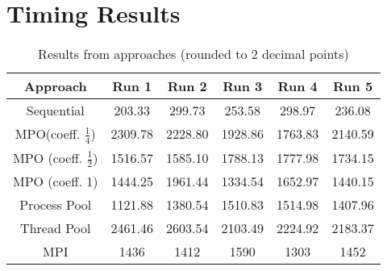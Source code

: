 \documentclass[a4paper, oneside]{article}
\begin{document}
\section{Timing Results}
\begin{table}[!htb]
    \centering
    \begin{tabular}{c | c | c | c | c | c }
        Approach                                & Run 1   & Run 2   & Run 3   & Run 4   & Run 5   \\
        \hline
        Sequential                              & 203.33  & 299.73  & 253.58  & 298.97  & 236.08  \\
        MPO\footnotemark (coeff. $\frac{1}{4}$) & 2309.78 & 2228.80 & 1928.86 & 1763.83 & 2140.59 \\
        MPO (coeff. $\frac{1}{2}$)              & 1516.57 & 1585.10 & 1788.13 & 1777.98 & 1734.15 \\
        MPO (coeff. 1)                          & 1444.25 & 1961.44 & 1334.54 & 1652.97 & 1440.15 \\
        Process Pool                            & 1121.88 & 1380.54 & 1510.83 & 1514.98 & 1407.96 \\
        Thread Pool                            & 2461.46 & 2603.54 & 2103.49 & 2224.92 & 2183.37 \\
        MPI                            & 1436 & 1412 & 1590 & 1303 & 1452 \\
        \hline
    \end{tabular}
    \caption{Results from approaches (rounded to 2 decimal points)}
\end{table}

\end{document}
